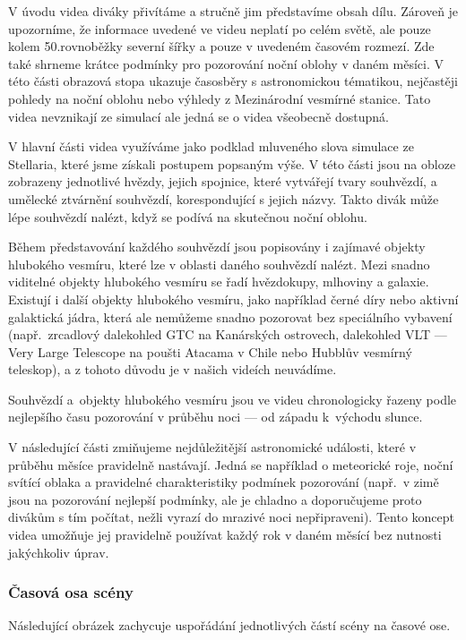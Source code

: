 \documentclass[12pt,a4paper,titlepage]{article}
\begin{document}
V úvodu videa diváky přivítáme a stručně jim představíme obsah dílu. Zároveň je upozorníme, že informace uvedené ve videu neplatí po celém světě, ale pouze kolem 50.\@ rovnoběžky severní šířky a pouze v uvedeném časovém rozmezí. Zde také shrneme krátce podmínky pro pozorování noční oblohy v daném měsíci. V této části obrazová stopa ukazuje časosběry s astronomickou tématikou, nejčastěji pohledy na noční oblohu nebo výhledy z Mezinárodní vesmírné stanice. Tato videa nevznikají ze simulací ale jedná se o videa všeobecně dostupná.

V hlavní části videa využíváme jako podklad mluveného slova simulace ze Stellaria, které jsme získali postupem popsaným výše. V této části jsou na obloze zobrazeny jednotlivé hvězdy, jejich spojnice, které vytvářejí tvary souhvězdí, a umělecké ztvárnění souhvězdí, korespondující s jejich názvy. Takto divák může lépe souhvězdí nalézt, když se podívá na skutečnou noční oblohu. 

Během představování každého souhvězdí jsou popisovány i zajímavé objekty hlubokého vesmíru, které lze v oblasti daného souhvězdí nalézt. Mezi snadno viditelné objekty hlubokého vesmíru se řadí hvězdokupy, mlhoviny a galaxie. Existují i další objekty hlubokého vesmíru, jako například černé díry nebo aktivní galaktická jádra, která ale nemůžeme snadno pozorovat bez speciálního vybavení (např.\ zrcadlový dalekohled GTC na Kanárských ostrovech, dalekohled VLT --- Very Large Telescope na poušti Atacama v Chile nebo Hubblův vesmírný teleskop), a z tohoto důvodu je v našich videích neuvádíme.

Souhvězdí a~objekty hlubokého vesmíru jsou ve videu chronologicky řazeny podle nejlepšího času pozorování v průběhu noci --- od západu k~východu slunce. 

V následující části zmiňujeme nejdůležitější astronomické události, které v průběhu měsíce pravidelně nastávají. Jedná se například o meteorické roje, noční svítící oblaka a pravidelné charakteristiky podmínek pozorování (např.\ v zimě jsou na pozorování nejlepší podmínky, ale je chladno a doporučujeme proto divákům s tím počítat, nežli vyrazí do mrazivé noci nepřipraveni). Tento koncept videa umožňuje jej pravidelně používat každý rok v daném měsící bez nutnosti jakýchkoliv úprav.

\subsubsection{Časová osa scény}\label{makingof:resolve:merging}
Následující obrázek zachycuje uspořádání jednotlivých částí scény na časové ose.
\end{document}

